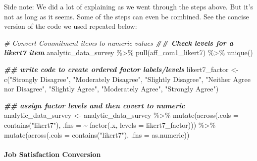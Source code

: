 \documentclass[
]{krantz}
\makeatletter
\newenvironment{Shaded}{\begin{snugshade}}{\end{snugshade}}
\newcommand{\AttributeTok}[1]{\textcolor[rgb]{0.61,0.61,0.61}{#1}}
\newcommand{\CommentTok}[1]{\textcolor[rgb]{0.37,0.37,0.37}{\textit{#1}}}
\newcommand{\DocumentationTok}[1]{\textcolor[rgb]{0.37,0.37,0.37}{\textbf{\textit{#1}}}}
\newcommand{\FunctionTok}[1]{\textcolor[rgb]{0,0,0}{#1}}
\newcommand{\NormalTok}[1]{#1}
\newcommand{\OtherTok}[1]{\textcolor[rgb]{0.37,0.37,0.37}{#1}}
\newcommand{\SpecialCharTok}[1]{\textcolor[rgb]{0,0,0}{#1}}
\newcommand{\StringTok}[1]{\textcolor[rgb]{0.5,0.5,0.5}{#1}}
\newenvironment{kframe}{%
\medskip{}
\setlength{\fboxsep}{.8em}
 \def\at@end@of@kframe{}%
 \ifinner\ifhmode%
  \def\at@end@of@kframe{\end{minipage}}%
  \begin{minipage}{\columnwidth}%
 \fi\fi%
 \def\FrameCommand##1{\hskip\@totalleftmargin \hskip-\fboxsep
 \colorbox{shadecolor}{##1}\hskip-\fboxsep
     \hskip-\linewidth \hskip-\@totalleftmargin \hskip\columnwidth}%
 \MakeFramed {\advance\hsize-\width
   \@totalleftmargin\z@ \linewidth\hsize
   \@setminipage}}%
 {\par\unskip\endMakeFramed%
 \at@end@of@kframe}
\renewenvironment{Shaded}{\begin{kframe}}{\end{kframe}}
\makeatother
\begin{document}
Side note: We did a lot of explaining as we went through the steps above. But it's not as long as it seems. Some of the steps can even be combined. See the concise version of the code we used repeated below:

\begin{Shaded}
\begin{Highlighting}[]
\CommentTok{\# Convert Commitment items to numeric  values}
\DocumentationTok{\#\# Check levels for a likert7 item}
\NormalTok{analytic\_data\_survey }\SpecialCharTok{\%\textgreater{}\%}
  \FunctionTok{pull}\NormalTok{(aff\_com1\_likert7) }\SpecialCharTok{\%\textgreater{}\%}
  \FunctionTok{unique}\NormalTok{()}

\DocumentationTok{\#\# write code to create ordered factor labels/levels}
\NormalTok{likert7\_factor }\OtherTok{\textless{}{-}} \FunctionTok{c}\NormalTok{(}\StringTok{"Strongly Disagree"}\NormalTok{,}
                    \StringTok{"Moderately Disagree"}\NormalTok{,}
                    \StringTok{"Slightly Disagree"}\NormalTok{,}
                    \StringTok{"Neither Agree nor Disagree"}\NormalTok{,}
                    \StringTok{"Slightly Agree"}\NormalTok{,}
                    \StringTok{"Moderately Agree"}\NormalTok{,}
                    \StringTok{"Strongly Agree"}\NormalTok{)}


\DocumentationTok{\#\# assign factor levels and then covert to numeric}
\NormalTok{analytic\_data\_survey }\OtherTok{\textless{}{-}}\NormalTok{ analytic\_data\_survey }\SpecialCharTok{\%\textgreater{}\%}
  \FunctionTok{mutate}\NormalTok{(}\FunctionTok{across}\NormalTok{(}\AttributeTok{.cols =} \FunctionTok{contains}\NormalTok{(}\StringTok{"likert7"}\NormalTok{), }
                \AttributeTok{.fns =} \SpecialCharTok{\textasciitilde{}} \FunctionTok{factor}\NormalTok{(.x, }\AttributeTok{levels =}\NormalTok{ likert7\_factor))) }\SpecialCharTok{\%\textgreater{}\%}
  \FunctionTok{mutate}\NormalTok{(}\FunctionTok{across}\NormalTok{(}\AttributeTok{.cols =} \FunctionTok{contains}\NormalTok{(}\StringTok{"likert7"}\NormalTok{), }
                \AttributeTok{.fns =}\NormalTok{ as.numeric))}
\end{Highlighting}
\end{Shaded}

\hypertarget{job-satisfaction-conversion}{%
\paragraph{Job Satisfaction Conversion}\label{job-satisfaction-conversion}}
\end{document}
